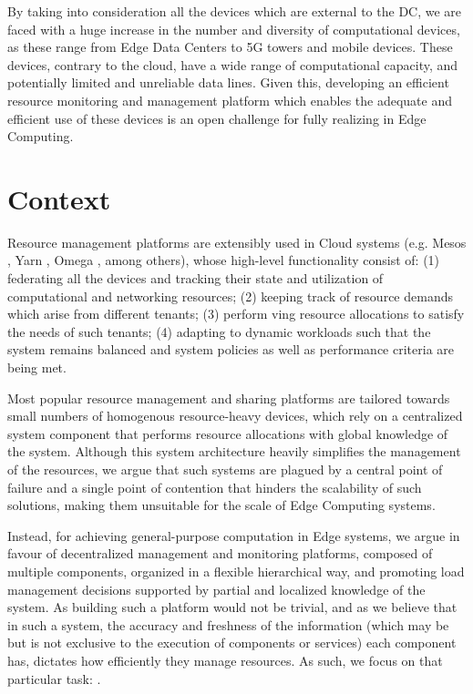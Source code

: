 By taking into consideration all the devices which are external to the DC, we are faced with a huge increase in the number and diversity of computational devices, as these range from Edge Data Centers to 5G towers and mobile devices. These devices, contrary to the cloud, have a wide range of computational capacity, and potentially limited and unreliable data lines.  Given this, developing an efficient resource monitoring and management platform which enables the adequate and efficient use of these devices is an open challenge for fully realizing in Edge Computing.

\section{Context}


Resource management platforms are extensibly used in Cloud systems (e.g. Mesos \cite{hindman2011mesos}, Yarn \cite{Vavilapalli2013ApacheHY}, Omega \cite{41684}, among others), whose high-level functionality consist of: (1) federating all the devices and tracking their state and utilization of computational and networking resources; (2) keeping track of resource demands which arise from different tenants; (3) perform ving resource allocations to satisfy the needs of such tenants; (4) adapting to dynamic workloads such that the system remains balanced and system policies as well as performance criteria are being met.

Most popular resource management and sharing platforms are tailored towards small numbers of homogenous resource-heavy devices, which rely on a centralized system component that performs resource allocations with global knowledge of the system. Although this system architecture heavily simplifies the management of the resources, we argue that such systems are plagued by a central point of failure and a single point of contention that hinders the scalability of such solutions, making them unsuitable for the scale of Edge Computing systems. 

Instead, for achieving general-purpose computation in Edge systems, we argue in favour of decentralized management and monitoring platforms, composed of multiple components, organized in a flexible hierarchical way, and promoting load management decisions supported by partial and localized knowledge of the system. As building such a platform would not be trivial, and as we believe that in such a system, the accuracy and freshness of the information (which may be but is not exclusive to the execution of components or services) each component has, dictates how efficiently they manage resources. As such, we focus on that particular task: .

